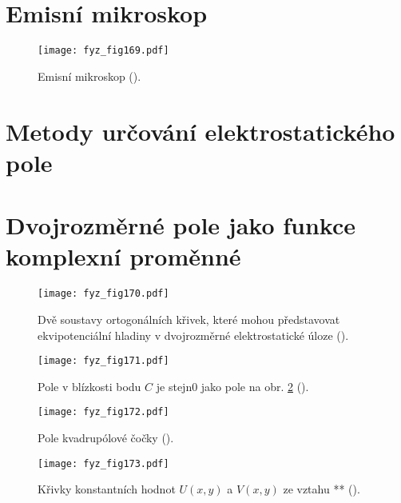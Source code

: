 {\section{Emisní mikroskop}\label{fyz:IIchapVsecXXI}

  \begin{figure}[ht!]  %
    \centering
    \texttt{[image: fyz\_fig169.pdf]}
    \caption{Emisní mikroskop (\cite[s.~118]{Feynman02}).}
    \label{fyz:fig169}
  \end{figure}
  
\section{Metody určování elektrostatického pole}\label{fyz:IIchapVsecXXII}
\section{Dvojrozměrné pole jako funkce komplexní proměnné}\label{fyz:IIchapVsecXXIII}

  \begin{figure}[ht!]  %
    \centering
    \texttt{[image: fyz\_fig170.pdf]}
    \caption{Dvě soustavy ortogonálních křivek, které mohou představovat ekvipotenciální hladiny v 
             dvojrozměrné elektrostatické úloze 
             (\cite[s.~126]{Feynman02}).}
    \label{fyz:fig170}
  \end{figure}

  \begin{figure}[ht!]  %
    \centering
    \texttt{[image: fyz\_fig171.pdf]}
    \caption{Pole v blízkosti bodu \(C\) je stejn0 jako pole na obr. \ref{fyz:fig170}
             (\cite[s.~127]{Feynman02}).}
    \label{fyz:fig171}
  \end{figure}

  \begin{figure}[ht!]  %
    \centering
    \texttt{[image: fyz\_fig172.pdf]}
    \caption{Pole kvadrupólové čočky
             (\cite[s.~127]{Feynman02}).}
    \label{fyz:fig172}
  \end{figure}

  \begin{figure}[ht!]  %
    \centering
    \texttt{[image: fyz\_fig173.pdf]}
    \caption{Křivky konstantních hodnot \(U(x, y)\) a \(V(x, y)\) ze vztahu **
             (\cite[s.~128]{Feynman02}).}
    \label{fyz:fig173}
  \end{figure}

}
